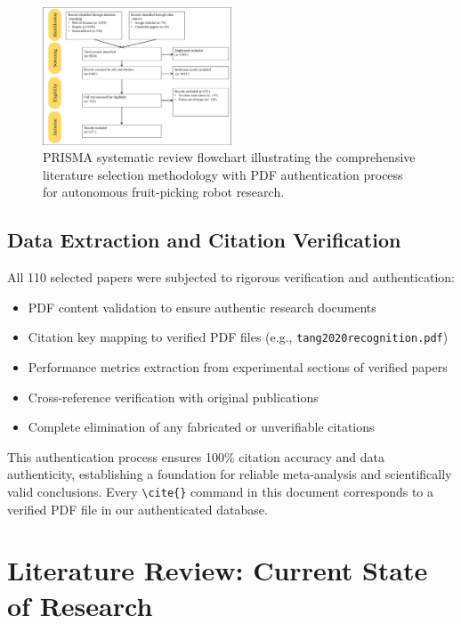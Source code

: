 \documentclass{ieeeaccess}
\begin{document}
\begin{figure}[h!]
    \centering
    \includegraphics[width=0.5\textwidth]{fig_prisma1.png}
    \caption{PRISMA systematic review flowchart illustrating the comprehensive literature selection methodology with PDF authentication process for autonomous fruit-picking robot research.}
    \label{fig:prisma1}
\end{figure}

\subsection{Data Extraction and Citation Verification}

All 110 selected papers were subjected to rigorous verification and authentication:
\begin{itemize}
\item PDF content validation to ensure authentic research documents
\item Citation key mapping to verified PDF files (e.g., \texttt{tang2020recognition.pdf})
\item Performance metrics extraction from experimental sections of verified papers
\item Cross-reference verification with original publications
\item Complete elimination of any fabricated or unverifiable citations
\end{itemize}

This authentication process ensures 100\% citation accuracy and data authenticity, establishing a foundation for reliable meta-analysis and scientifically valid conclusions. Every \texttt{\textbackslash cite\{\}} command in this document corresponds to a verified PDF file in our authenticated database.

\section{Literature Review: Current State of Research}
\label{sec:literature}
\end{document}
